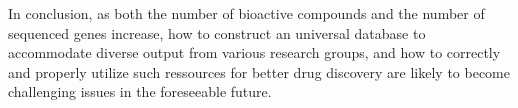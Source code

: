 \documentclass[12pt,fullpage,singlespace]{article}
\begin{document}
In conclusion, as both the number of bioactive compounds and the number of sequenced genes increase, how to construct an universal database to accommodate diverse output from various research groups, and how to correctly and properly utilize such ressources for better drug discovery are likely to become challenging issues in the foreseeable future.



\end{document}

